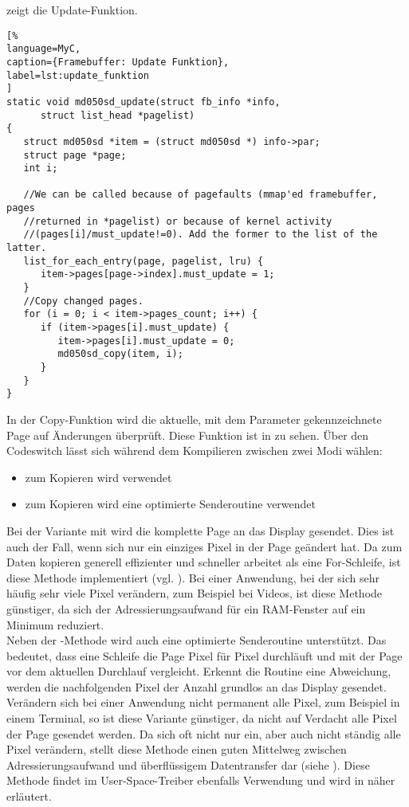  zeigt die Update-Funktion.
\begin{lstlisting}[%
language=MyC,
caption={Framebuffer: Update Funktion},
label=lst:update_funktion
]
static void md050sd_update(struct fb_info *info,
      struct list_head *pagelist)
{
   struct md050sd *item = (struct md050sd *) info->par;
   struct page *page;
   int i;

   //We can be called because of pagefaults (mmap'ed framebuffer, pages
   //returned in *pagelist) or because of kernel activity
   //(pages[i]/must_update!=0). Add the former to the list of the latter.
   list_for_each_entry(page, pagelist, lru) {
      item->pages[page->index].must_update = 1;
   }
   //Copy changed pages.
   for (i = 0; i < item->pages_count; i++) {
      if (item->pages[i].must_update) {
         item->pages[i].must_update = 0;
         md050sd_copy(item, i);
      }
   }
}
\end{lstlisting}
In der Copy-Funktion wird die aktuelle, mit dem Parameter  gekennzeichnete Page auf Änderungen überprüft. Diese Funktion ist in  zu sehen. Über den Codeswitch  lässt sich während dem Kompilieren zwischen zwei Modi wählen:
\begin{itemize}
	\item zum Kopieren wird  verwendet
	\item zum Kopieren wird eine optimierte Senderoutine verwendet
\end{itemize}

Bei der Variante mit  wird die komplette Page an das Display gesendet. Dies ist auch der Fall, wenn sich nur ein einziges Pixel in der Page geändert hat. Da zum Daten kopieren  generell effizienter und schneller arbeitet als eine For-Schleife, ist diese Methode implementiert (vgl. \cite{Nadeau2012}). Bei einer Anwendung, bei der sich sehr häufig sehr viele Pixel verändern, zum Beispiel bei Videos, ist diese Methode günstiger, da sich der Adressierungsaufwand für ein RAM-Fenster auf ein Minimum reduziert. \\
Neben der -Methode wird auch eine optimierte Senderoutine unterstützt. Das bedeutet, dass eine Schleife die Page Pixel für Pixel durchläuft und mit der Page vor dem aktuellen Durchlauf vergleicht. Erkennt die Routine eine Abweichung, werden die nachfolgenden Pixel der Anzahl  grundlos an das Display gesendet. Verändern sich bei einer Anwendung nicht permanent alle Pixel, zum Beispiel in einem Terminal, so ist diese Variante günstiger, da nicht auf Verdacht alle Pixel der Page gesendet werden. Da sich oft nicht nur ein, aber auch nicht ständig alle Pixel  verändern, stellt diese Methode einen guten Mittelweg zwischen Adressierungsaufwand und überflüssigem Datentransfer dar (siehe \cite{Schlegel2013a}). Diese Methode findet im User-Space-Treiber ebenfalls Verwendung und wird in  näher erläutert.

